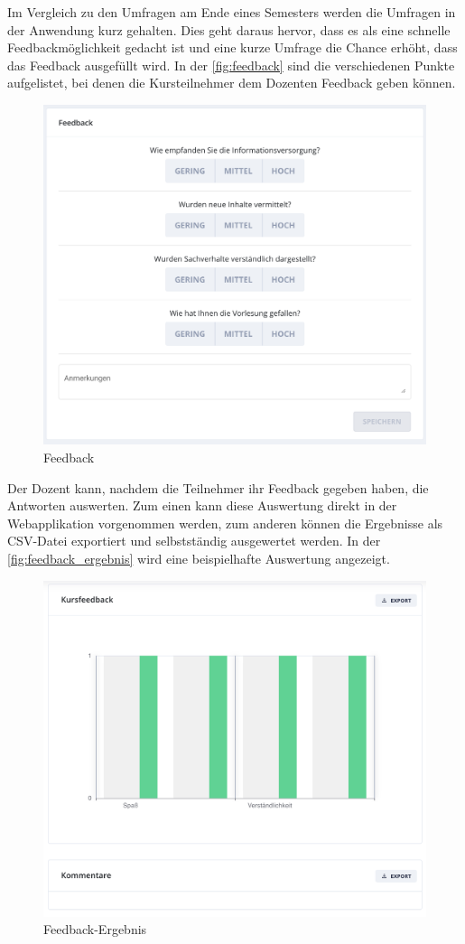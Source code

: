 Im Vergleich zu den Umfragen am Ende eines Semesters werden die Umfragen in der Anwendung kurz gehalten.
Dies geht daraus hervor, dass es als eine schnelle Feedbackmöglichkeit gedacht ist und eine kurze Umfrage die Chance erhöht, dass das Feedback ausgefüllt wird.
In der \autoref{fig:feedback} sind die verschiedenen Punkte aufgelistet, bei denen die Kursteilnehmer dem Dozenten Feedback geben können.
\begin{figure}[!h] 
    \centering
    \includegraphics[width=.7\textwidth]{img/Feedback_geben.png}
    \caption{Feedback}
    \label{fig:feedback}
\end{figure}
Der Dozent kann, nachdem die Teilnehmer ihr Feedback gegeben haben, die Antworten auswerten. Zum einen kann diese Auswertung direkt in der Webapplikation vorgenommen werden, zum anderen können die Ergebnisse als CSV-Datei exportiert und selbstständig ausgewertet werden. In der \autoref{fig:feedback_ergebnis} 
wird eine beispielhafte Auswertung angezeigt.
\begin{figure}[!h] 
    \centering
    \includegraphics[width=.7\textwidth]{img/Feedback_uebersicht_Teilnehmer_Feedback.png}
    \caption{Feedback-Ergebnis}
    \label{fig:feedback_ergebnis}
\end{figure}
